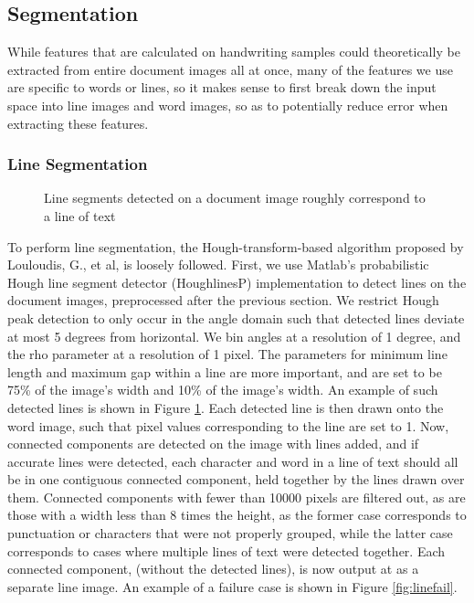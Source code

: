 \documentclass[paper=a4, fontsize=11pt]{scrartcl} %
\numberwithin{equation}{section} %
\numberwithin{figure}{section} %
\numberwithin{table}{section} %
\begin{document}
\subsection{Segmentation}
While features that are calculated on handwriting samples could
theoretically be extracted from entire document images all at once,
many of the features we use are specific to words or lines, so it
makes sense to first break down the input space into line images and
word images, so as to potentially reduce error when extracting these
features.

\subsubsection{Line Segmentation}

\begin{figure}
  \label{fig:houghLineDetect}
  \caption{Line segments detected on a document image roughly
    correspond to a line of text}
\end{figure}

To perform line segmentation, the Hough-transform-based algorithm
proposed by Louloudis, G., et al, \cite{BlockBased} is loosely
followed. First, we use Matlab’s probabilistic Hough line segment
detector (HoughlinesP) implementation to detect lines on the document
images, preprocessed after the previous section. We restrict Hough
peak detection to only occur in the angle domain such that detected
lines deviate at most 5 degrees from horizontal. We bin angles at a
resolution of 1 degree, and the rho parameter at a resolution of 1
pixel. The parameters for minimum line length and maximum gap within a
line are more important, and are set to be 75\% of the image’s width
and 10\% of the image’s width. An example of such detected lines is
shown in Figure \ref{fig:houghLineDetect}. Each detected line is then
drawn onto the word image, such that pixel values corresponding to the
line are set to 1. Now, connected components are detected on the image
with lines added, and if accurate lines were detected, each character
and word in a line of text should all be in one contiguous connected
component, held together by the lines drawn over them. Connected
components with fewer than 10000 pixels are filtered out, as are those
with a width less than 8 times the height, as the former case
corresponds to punctuation or characters that were not properly
grouped, while the latter case corresponds to cases where multiple
lines of text were detected together. Each connected component,
(without the detected lines), is now output at as a separate line
image. An example of a failure case is shown in Figure \ref{fig:linefail}.
\end{document}
